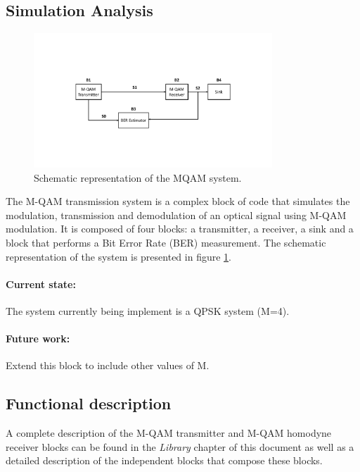 \subsection{Simulation Analysis}

\begin{figure}[h]
	\centering
	\includegraphics[width=0.8\textwidth]{./sdf/m_qam_system/figures/MQAM_system_block_diagram}
	\caption{Schematic representation of the MQAM system.}\label{MQAM_system_block_diagram}
\end{figure}

The M-QAM transmission system is a complex block of code that simulates the modulation, transmission and
demodulation of an optical signal using M-QAM modulation.
It is composed of four blocks: a transmitter, a receiver, a sink and a block that performs a Bit Error Rate (BER) measurement. The schematic representation of the
system is presented in figure \ref{MQAM_system_block_diagram}. 

\paragraph{Current state:} The system currently being implement is a QPSK system (M=4).

\paragraph{Future work:} Extend this block to include other values of M.

\subsection*{Functional description}

A complete description of the M-QAM transmitter and M-QAM homodyne receiver blocks can be found in the \textit{Library} chapter of this document as well as a detailed description of the independent blocks that compose these blocks.

